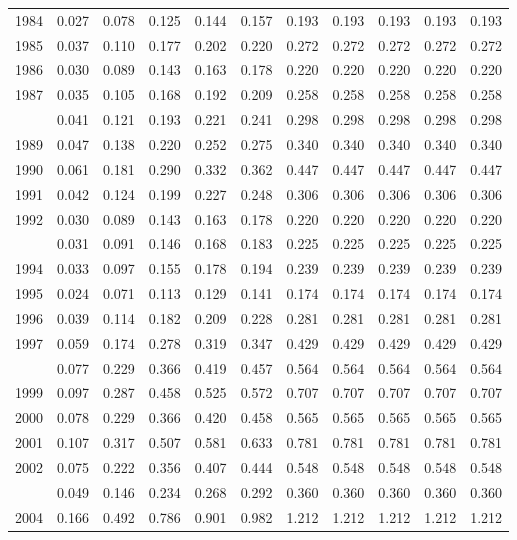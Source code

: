 \documentclass[
]{article}
\begin{document}
\begin{longtable}[t]{lrrrrrrrrrr}
1984 & 0.027 & 0.078 & 0.125 & 0.144 & 0.157 & 0.193 & 0.193 & 0.193 & 0.193 & 0.193\\
1985 & 0.037 & 0.110 & 0.177 & 0.202 & 0.220 & 0.272 & 0.272 & 0.272 & 0.272 & 0.272\\
1986 & 0.030 & 0.089 & 0.143 & 0.163 & 0.178 & 0.220 & 0.220 & 0.220 & 0.220 & 0.220\\
1987 & 0.035 & 0.105 & 0.168 & 0.192 & 0.209 & 0.258 & 0.258 & 0.258 & 0.258 & 0.258\\
\addlinespace
1988 & 0.041 & 0.121 & 0.193 & 0.221 & 0.241 & 0.298 & 0.298 & 0.298 & 0.298 & 0.298\\
1989 & 0.047 & 0.138 & 0.220 & 0.252 & 0.275 & 0.340 & 0.340 & 0.340 & 0.340 & 0.340\\
1990 & 0.061 & 0.181 & 0.290 & 0.332 & 0.362 & 0.447 & 0.447 & 0.447 & 0.447 & 0.447\\
1991 & 0.042 & 0.124 & 0.199 & 0.227 & 0.248 & 0.306 & 0.306 & 0.306 & 0.306 & 0.306\\
1992 & 0.030 & 0.089 & 0.143 & 0.163 & 0.178 & 0.220 & 0.220 & 0.220 & 0.220 & 0.220\\
\addlinespace
1993 & 0.031 & 0.091 & 0.146 & 0.168 & 0.183 & 0.225 & 0.225 & 0.225 & 0.225 & 0.225\\
1994 & 0.033 & 0.097 & 0.155 & 0.178 & 0.194 & 0.239 & 0.239 & 0.239 & 0.239 & 0.239\\
1995 & 0.024 & 0.071 & 0.113 & 0.129 & 0.141 & 0.174 & 0.174 & 0.174 & 0.174 & 0.174\\
1996 & 0.039 & 0.114 & 0.182 & 0.209 & 0.228 & 0.281 & 0.281 & 0.281 & 0.281 & 0.281\\
1997 & 0.059 & 0.174 & 0.278 & 0.319 & 0.347 & 0.429 & 0.429 & 0.429 & 0.429 & 0.429\\
\addlinespace
1998 & 0.077 & 0.229 & 0.366 & 0.419 & 0.457 & 0.564 & 0.564 & 0.564 & 0.564 & 0.564\\
1999 & 0.097 & 0.287 & 0.458 & 0.525 & 0.572 & 0.707 & 0.707 & 0.707 & 0.707 & 0.707\\
2000 & 0.078 & 0.229 & 0.366 & 0.420 & 0.458 & 0.565 & 0.565 & 0.565 & 0.565 & 0.565\\
2001 & 0.107 & 0.317 & 0.507 & 0.581 & 0.633 & 0.781 & 0.781 & 0.781 & 0.781 & 0.781\\
2002 & 0.075 & 0.222 & 0.356 & 0.407 & 0.444 & 0.548 & 0.548 & 0.548 & 0.548 & 0.548\\
\addlinespace
2003 & 0.049 & 0.146 & 0.234 & 0.268 & 0.292 & 0.360 & 0.360 & 0.360 & 0.360 & 0.360\\
2004 & 0.166 & 0.492 & 0.786 & 0.901 & 0.982 & 1.212 & 1.212 & 1.212 & 1.212 & 1.212\\

\end{longtable}
\end{document}
